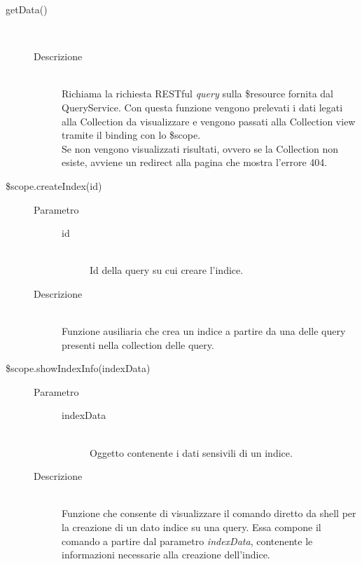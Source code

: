 \begin{description}
\begin{description}
  \item[getData()] \hfill \\
  \begin{description}
  	\item[Descrizione] \hfill \\
  Richiama la richiesta RESTful \textit{query} sulla \$resource fornita dal QueryService.
  Con questa funzione vengono prelevati i dati legati alla Collection da visualizzare e vengono
  passati alla Collection view tramite il binding con lo \$scope. \\
  Se non vengono visualizzati risultati, ovvero se la Collection non esiste, avviene un redirect alla pagina
  che mostra l'errore 404.
  \end{description}
  
    \item[\$scope.createIndex(id)] \hfill
    \begin{description}
  	\item[Parametro] \hfill
  		\begin{description}
  			\item[id] \hfill \\
  			Id della query su cui creare l'indice.
       \end{description}
  	\item[Descrizione] \hfill \\
  Funzione ausiliaria che crea un indice a partire da una delle query presenti nella collection delle query.

    \end{description}
 
 \item[\$scope.showIndexInfo(indexData)] \hfill
 \begin{description}
 	\item[Parametro] \hfill
  		\begin{description}
  			\item[indexData] \hfill \\
  			Oggetto contenente i dati sensivili di un indice.
       \end{description}
  	\item[Descrizione] \hfill \\
  	Funzione che consente di visualizzare il comando diretto da shell per la creazione di un dato indice su una query. Essa compone il comando a partire dal parametro \textit{indexData}, contenente le informazioni necessarie alla creazione dell'indice.
 \end{description}
 

\end{description}
\end{description}
